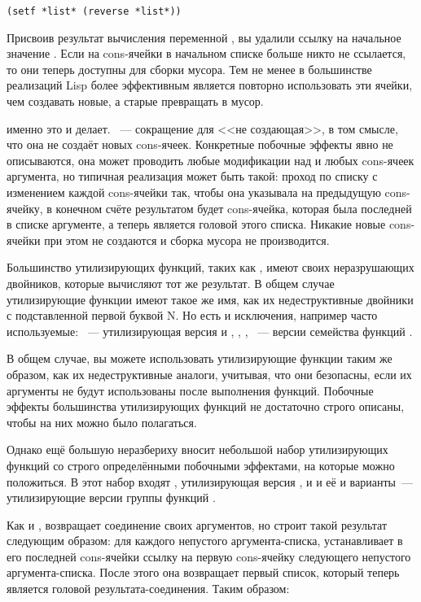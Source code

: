 \begin{lstlisting}
(setf *list* (reverse *list*))
\end{lstlisting}

Присвоив результат вычисления переменной , вы удалили ссылку на начальное
значение . Если на cons-ячейки в начальном списке больше никто не ссылается,
то они теперь доступны для сборки мусора. Тем не менее в большинстве реализаций Lisp более
эффективным является повторно использовать эти ячейки, чем создавать новые, а старые
превращать в мусор.

 именно это и делает. ~--- сокращение для <<не создающая>>, в том
смысле, что она не создаёт новых cons-ячеек. Конкретные побочные эффекты 
явно не описываются, она может проводить любые модификации над  и 
любых cons-ячеек аргумента, но типичная реализация может быть такой: проход по списку с
изменением  каждой cons-ячейки так, чтобы она указывала на предыдущую
cons-ячейку, в конечном счёте результатом будет cons-ячейка, которая была последней в
списке аргументе, а теперь является головой этого списка. Никакие новые cons-ячейки при
этом не создаются и сборка мусора не производится.

Большинство утилизирующих функций, таких как , имеют своих неразрушающих
двойников, которые вычисляют тот же результат. В общем случае утилизирующие функции имеют
такое же имя, как их недеструктивные двойники с подставленной первой буквой N. Но есть и
исключения, например часто используемые: ~--- утилизирующая версия
 и , , ,
~--- версии семейства функций .

В общем случае, вы можете использовать утилизирующие функции таким же образом, как их
недеструктивные аналоги, учитывая, что они безопасны, если их аргументы не будут
использованы после выполнения функций. Побочные эффекты большинства утилизирующих функций
не достаточно строго описаны, чтобы на них можно было полагаться.

Однако ещё большую неразбериху вносит небольшой набор утилизирующих функций со строго
определёнными побочными эффектами, на которые можно положиться. В этот набор входят
, утилизирующая версия , и  и её  и
 варианты~--- утилизирующие версии группы функций .

Как и ,  возвращает соединение своих аргументов, но строит такой
результат следующим образом: для каждого непустого аргумента-списка, 
устанавливает в  его последней cons-ячейки ссылку на первую cons-ячейку
следующего непустого аргумента-списка. После этого она возвращает первый список, который
теперь является головой результата-соединения. Таким образом:


